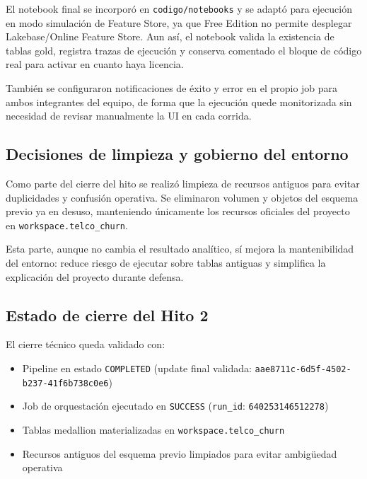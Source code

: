 \documentclass[12pt,a4paper]{article}
\begin{document}
El notebook final se incorporó en \nolinkurl{codigo/notebooks} y se adaptó para ejecución en modo simulación de Feature Store, ya que Free Edition no permite desplegar Lakebase/Online Feature Store. Aun así, el notebook valida la existencia de tablas gold, registra trazas de ejecución y conserva comentado el bloque de código real para activar en cuanto haya licencia.\par

También se configuraron notificaciones de éxito y error en el propio job para ambos integrantes del equipo, de forma que la ejecución quede monitorizada sin necesidad de revisar manualmente la UI en cada corrida.\par

\subsection{Decisiones de limpieza y gobierno del entorno}

Como parte del cierre del hito se realizó limpieza de recursos antiguos para evitar duplicidades y confusión operativa. Se eliminaron volumen y objetos del esquema previo ya en desuso, manteniendo únicamente los recursos oficiales del proyecto en \nolinkurl{workspace.telco_churn}.\par

Esta parte, aunque no cambia el resultado analítico, sí mejora la mantenibilidad del entorno: reduce riesgo de ejecutar sobre tablas antiguas y simplifica la explicación del proyecto durante defensa.\par

\subsection{Estado de cierre del Hito 2}

El cierre técnico queda validado con:\par

\begin{itemize}
\item Pipeline en estado \nolinkurl{COMPLETED} (update final validada: \nolinkurl{aae8711c-6d5f-4502-b237-41f6b738c0e6})
\item Job de orquestación ejecutado en \nolinkurl{SUCCESS} (\nolinkurl{run_id}: \nolinkurl{640253146512278})
\item Tablas medallion materializadas en \nolinkurl{workspace.telco_churn}
\item Recursos antiguos del esquema previo limpiados para evitar ambigüedad operativa
\end{itemize}
\end{document}
